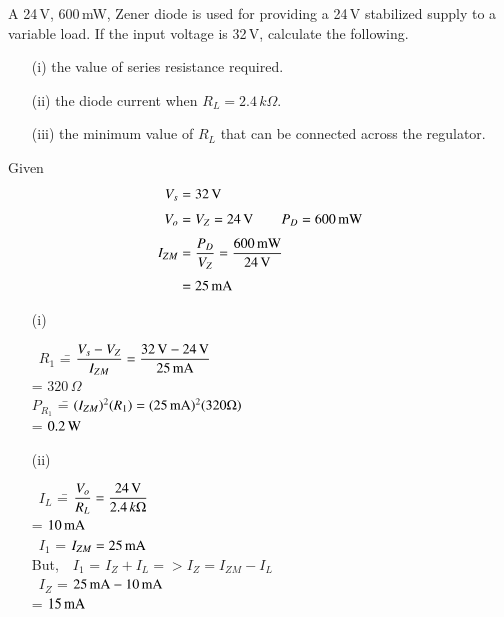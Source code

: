 \begin{example}\label{exam2.30}
A 24\,V, 600\,mW, Zener diode is used for providing a 24\,V stabilized supply to a variable load. If the input voltage is 32\,V, calculate the following.
\begin{itemize}
\item[(i)] the value of series resistance required.

\item[(ii)] the diode current when $R_{L}=2.4\,k\Omega$.

\item[(iii)] the minimum value of $R_{L}$ that can be connected across the regulator.
\end{itemize}
\end{example}

\begin{solution}
Given
\begin{align*}
V_{s} &= 32\text{\,V}\\[3pt]
V_{o} &= V_{Z}=24\text{\,V}\qquad P_{D}=600\text{\,mW}\\[3pt]
I_{ZM} &= \frac{P_{D}}{V_{Z}}=\frac{600\,\text{mW}}{24\text{\,V}}\\[3pt]
&= 25\text{\,mA}
\end{align*}
\begin{itemize}
\item[(i)]
\begin{tabbing}
~$R_{1}$ \== $\dfrac{V_{s}-V_{Z}}{I_{ZM}}=\dfrac{32\text{\,V}-24\text{\,V}}{25\text{\,mA}}$\\[6pt]
\>= $320\,\Omega$\\[6pt]
$P_{R_{1}}$ \== $(I_{ZM})^{2}(R_{1})=(25\text{\,mA})^{2}(320\Omega)$\\[6pt]
\>= $0.2\text{\,W}$
\end{tabbing}

\item[(ii)] 
\begin{tabbing}
\qquad~$I_{L}$ \== $\dfrac{V_{o}}{R_{L}}=\dfrac{24\text{\,V}}{2.4\,k\Omega}$\\[6pt]
        \>= $10\text{\,mA}$\\[6pt]
\qquad~$I_{1}$ \>= $I_{ZM}=25\text{\,mA}$\\[6pt]
But, \ \,$I_{1}$ \>= $I_{Z}+I_{L}=> I_{Z}=I_{ZM}-I_{L}$\\[6pt]
\qquad~$I_{Z}$ \>= $25\text{\,mA}-10\text{\,mA}$\\[6pt]
               \>= $15\text{\,mA}$
\end{tabbing}


\end{itemize}
\end{solution}
